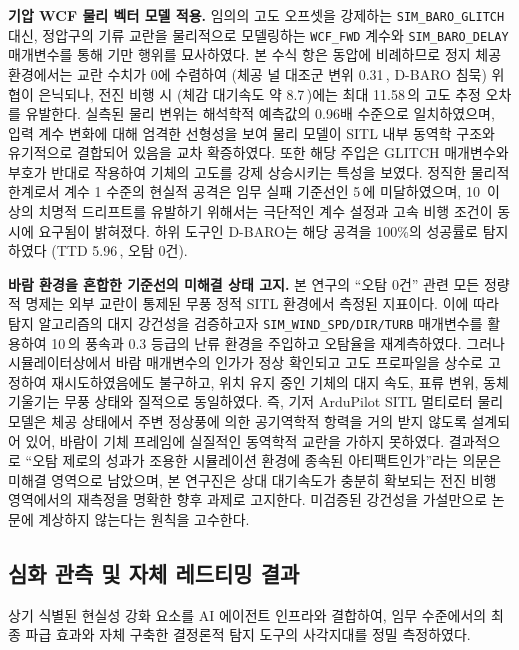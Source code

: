 \textbf{기압 WCF 물리 벡터 모델 적용.} 임의의 고도 오프셋을 강제하는 \texttt{SIM\_BARO\_GLITCH} 대신, 정압구의 기류 교란을 물리적으로 모델링하는 \texttt{WCF\_FWD} 계수와 \texttt{SIM\_BARO\_DELAY} 매개변수를 통해 기만 행위를 묘사하였다. 본 수식 항은 동압에 비례하므로 정지 체공 환경에서는 교란 수치가 0에 수렴하여 (체공 널 대조군 변위 0.31\,, D-BARO 침묵) 위협이 은닉되나, 전진 비행 시 (체감 대기속도 약 8.7\,)에는 최대 11.58\,의 고도 추정 오차를 유발한다. 실측된 물리 변위는 해석학적 예측값의 0.96배 수준으로 일치하였으며, 입력 계수 변화에 대해 엄격한 선형성을 보여 물리 모델이 SITL 내부 동역학 구조와 유기적으로 결합되어 있음을 교차 확증하였다. 또한 해당 주입은 GLITCH 매개변수와 부호가 반대로 작용하여 기체의 고도를 강제 상승시키는 특성을 보였다. 정직한 물리적 한계로서 계수 1 수준의 현실적 공격은 임무 실패 기준선인 5\,에 미달하였으며, 10\, 이상의 치명적 드리프트를 유발하기 위해서는 극단적인 계수 설정과 고속 비행 조건이 동시에 요구됨이 밝혀졌다. 하위 도구인 D-BARO는 해당 공격을 100\%의 성공률로 탐지하였다 (TTD 5.96\,, 오탐 0건).

\textbf{바람 환경을 혼합한 기준선의 미해결 상태 고지.} 본 연구의 ``오탐 0건'' 관련 모든 정량적 명제는 외부 교란이 통제된 무풍 정적 SITL 환경에서 측정된 지표이다. 이에 따라 탐지 알고리즘의 대지 강건성을 검증하고자 \texttt{SIM\_WIND\_SPD/DIR/TURB} 매개변수를 활용하여 10\,의 풍속과 0.3 등급의 난류 환경을 주입하고 오탐율을 재계측하였다. 그러나 시뮬레이터상에서 바람 매개변수의 인가가 정상 확인되고 고도 프로파일을 상수로 고정하여 재시도하였음에도 불구하고, 위치 유지 중인 기체의 대지 속도, 표류 변위, 동체 기울기는 무풍 상태와 질적으로 동일하였다. 즉, 기저 ArduPilot SITL 멀티로터 물리 모델은 체공 상태에서 주변 정상풍에 의한 공기역학적 항력을 거의 받지 않도록 설계되어 있어, 바람이 기체 프레임에 실질적인 동역학적 교란을 가하지 못하였다. 결과적으로 ``오탐 제로의 성과가 조용한 시뮬레이션 환경에 종속된 아티팩트인가''라는 의문은 미해결 영역으로 남았으며, 본 연구진은 상대 대기속도가 충분히 확보되는 전진 비행 영역에서의 재측정을 명확한 향후 과제로 고지한다. 미검증된 강건성을 가설만으로 논문에 계상하지 않는다는 원칙을 고수한다.

\subsection{심화 관측 및 자체 레드티밍 결과}

상기 식별된 현실성 강화 요소를 AI 에이전트 인프라와 결합하여, 임무 수준에서의 최종 파급 효과와 자체 구축한 결정론적 탐지 도구의 사각지대를 정밀 측정하였다.

